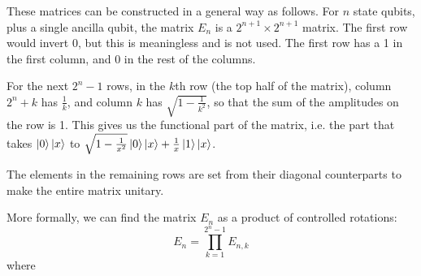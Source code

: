 \documentclass[12pt]{extarticle}
\begin{document}
These matrices can be constructed in a general way as follows.
For $n$ state qubits, plus a single ancilla qubit, the matrix $E_n$ is a $2^{n+1} \times 2^{n+1}$ matrix.
The first row would invert 0, but this is meaningless and is not used. The first row has a 1 in the first column, and 0 in the rest of the columns.

For the next $2^n-1$ rows, in the $k$th row (the top half of the matrix), column $2^n+k$ has $\frac{1}{k}$, and column $k$ has $\sqrt{1-\frac{1}{k^2}}$, so that the sum of the amplitudes on the row is 1.
This gives us the functional part of the matrix, i.e. the part that takes $\ket{0}\ket{x}$ to $\sqrt{1-\frac{1}{x^2}}\ket{0}\ket{x} + \frac{1}{x}\ket{1}\ket{x}$.

The elements in the remaining rows are set from their diagonal counterparts to make the entire matrix unitary.

More formally, we can find the matrix $E_n$ as a product of controlled rotations:
\[
E_n = \prod_{k=1}^{2^n-1} E_{n,k}
\]
where

\printbibliography
{}
\end{document}

